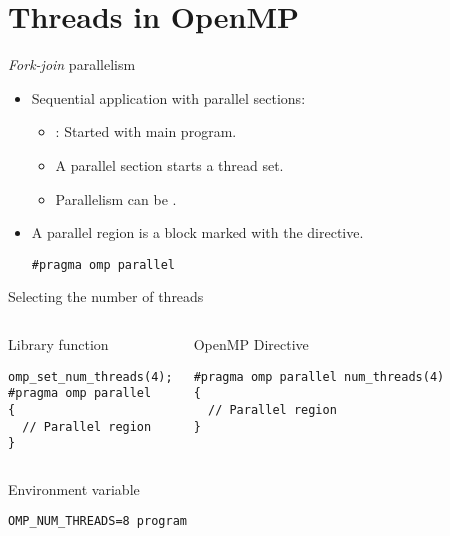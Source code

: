 \section{Threads in OpenMP}

\begin{frame}[t,fragile]{\emph{Fork-join} parallelism}
\begin{itemize}
  \item Sequential application with parallel sections:
    \begin{itemize}
      \item {}: Started with main program.
      \item A parallel section starts a thread set.
      \item Parallelism can be . 
    \end{itemize}

  \item A parallel region is a block marked with the  directive.
\begin{lstlisting}
#pragma omp parallel
\end{lstlisting}
\end{itemize}
\end{frame}

\begin{frame}[t,fragile]{Selecting the number of threads}
\begin{columns}[T]

\begin{block}{Library function}
\begin{lstlisting}[basicstyle=\tiny]
omp_set_num_threads(4);
#pragma omp parallel
{
  // Parallel region
}
\end{lstlisting}
\end{block}

\begin{block}{OpenMP Directive}
\begin{lstlisting}[basicstyle=\tiny]
#pragma omp parallel num_threads(4)
{
  // Parallel region
}
\end{lstlisting}
\end{block}
\end{columns}

\begin{columns}



\begin{block}{Environment variable}
\begin{lstlisting}[style=terminal,basicstyle=\tiny]
OMP_NUM_THREADS=8 program
\end{lstlisting}
\end{block}

\end{columns}
\end{frame}


